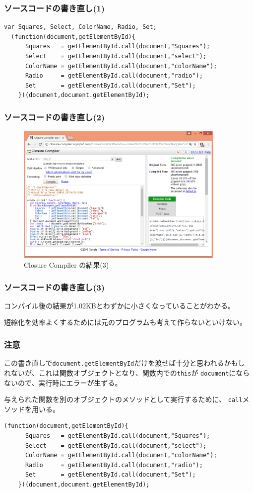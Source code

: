 \begin{frame}[containsverbatim]
 \frametitle{ソースコードの書き直し(1)}
\begin{Verbatim}[fontsize=\footnotesize]
  var Squares, Select, ColorName, Radio, Set;
  (function(document,getElementById){
      Squares   = getElementById.call(document,"Squares");
      Select    = getElementById.call(document,"select");
      ColorName = getElementById.call(document,"colorName");
      Radio     = getElementById.call(document,"radio");
      Set       = getElementById.call(document,"Set");
	})(document,document.getElementById);
\end{Verbatim}
\end{frame}
\begin{frame}[containsverbatim]
 \frametitle{ソースコードの書き直し(2)}
 \begin{figure}[ht]
	\begin{center}
	 \includegraphics[width=0.9\textwidth]{../10-01closur-compiler-res04.eps}
	\end{center}
 \caption{Closure Compiler の結果(3)}\label{closure-compiler-res03}
 \end{figure}
\end{frame}
\begin{frame}[containsverbatim]
 \frametitle{ソースコードの書き直し(3)}
 コンパイル後の結果が1.02KBとわずかに小さくなっていることがわかる。

 短縮化を効率よくするためには元のプログラムも考えて作らないといけない。
\end{frame}
 \begin{frame}[containsverbatim]
\frametitle{注意}
この書き直しで\texttt{document.getElementById}だけを渡せば十分と思われるかもし
 れないが、これは関数オブジェクトとなり、関数内での\texttt{this}が
  \texttt{document}にならないので、実行時にエラーが生ずる。

与えられた関数を別のオブジェクトのメソッドとして実行するために、
  \texttt{call}メソッドを用いる。
\begin{Verbatim}[fontsize=\small]
  (function(document,getElementById){
      Squares   = getElementById.call(document,"Squares");
      Select    = getElementById.call(document,"select");
      ColorName = getElementById.call(document,"colorName");
      Radio     = getElementById.call(document,"radio");
      Set       = getElementById.call(document,"Set");
	})(document,document.getElementById);
\end{Verbatim}
 \end{frame}


